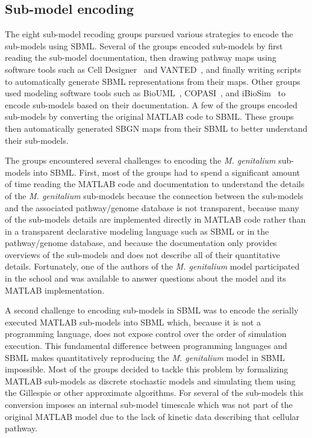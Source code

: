 \documentclass[journal,transmag]{IEEEtran}
\begin{document}
\subsection{Sub-model encoding}
The eight sub-model recoding groups pursued various strategies to encode the sub-models using SBML. Several of the groups encoded sub-models by first reading the sub-model documentation, then drawing pathway maps using software tools such as Cell Designer~\cite{funahashi2008celldesigner} and VANTED~\cite{Rohn2012}, and finally writing scripts to automatically generate SBML representations from their maps. Other groups used modeling software tools such as BioUML~\cite{Kolpakov2006}, COPASI~\cite{Mendes2009}, and iBioSim~\cite{Madsen2012} to encode sub-models based on their documentation. A few of the groups encoded sub-models by converting the original MATLAB code to SBML. These groups then automatically generated SBGN maps from their SBML to better understand their sub-models.

The groups encountered several challenges to encoding the \textit{M. genitalium} sub-models into SBML. First, most of the groups had to spend a significant amount of time reading the MATLAB code and documentation to understand the details of the \textit{M. genitalium} sub-models because the connection between the sub-models and the associated pathway/genome database is not transparent,  because many of the sub-models details are implemented directly in MATLAB code rather than in a transparent declarative modeling language such as SBML or in the pathway/genome database, and because the documentation only provides overviews of the sub-models and does not describe all of their quantitative details. Fortunately, one of the authors of the \textit{M. genitalium} model participated in the school and was available to answer questions about the model and its MATLAB implementation.

A second challenge to encoding sub-models in SBML was to encode the serially executed MATLAB sub-models into SBML which, because it is not a programming language, does not expose control over the order of simulation execution. This fundamental difference between programming languages and SBML makes quantitatively reproducing the \textit{M. genitalium} model in SBML impossible. Most of the groups decided to tackle this problem by formalizing MATLAB sub-models as discrete stochastic models and simulating them using the Gillespie or other approximate algorithms. For several of the sub-models this conversion imposes an internal sub-model timescale which was not part of the original MATLAB model due to the lack of kinetic data describing that cellular pathway.
\end{document}
